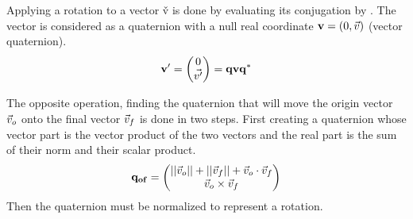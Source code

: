 Applying a rotation  to a vector \v{v} is done by evaluating its
conjugation by . The vector is considered as a quaternion with a null real
coordinate $\mathbf{v} = (0,\vec{v})$ (vector quaternion).
\begin{equation}
	\mathbf{v'} = \begin{pmatrix}0\\\vec{v'}\end{pmatrix} = \mathbf{q}\mathbf{v}\mathbf{q^{*}}
\end{equation}

The opposite operation, finding the quaternion that will move the origin vector $\vec{v}_o$ onto the final vector
$\vec{v}_{f}$ is done in two steps. First creating a quaternion  whose vector part is the vector product of the
two vectors and the real part is the sum of their norm and their scalar product.
\begin{equation}
	\mathbf{q_{of}} = \begin{pmatrix}||\vec{v}_o|| + ||\vec{v}_f|| + \vec{v}_o\cdot\vec{v}_f\\\vec{v}_o\times\vec{v}_f\end{pmatrix}
\end{equation}
Then the quaternion must be normalized to represent a rotation.

